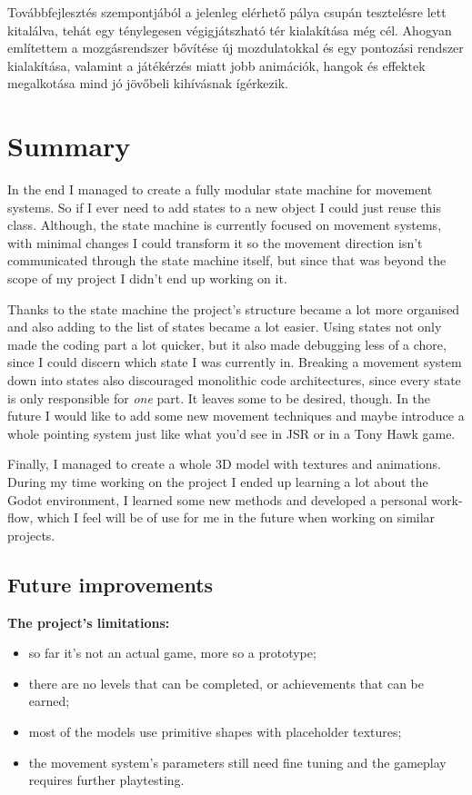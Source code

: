 Továbbfejlesztés szempontjából a jelenleg elérhető pálya csupán tesztelésre lett kitalálva, tehát egy ténylegesen végigjátszható tér kialakítása még cél. Ahogyan említettem a mozgásrendszer bővítése új mozdulatokkal és egy pontozási rendszer kialakítása, valamint a játékérzés miatt jobb animációk, hangok és effektek megalkotása mind jó jövőbeli kihívásnak ígérkezik.

\chapter{Summary}

In the end I managed to create a fully modular state machine for movement systems. So if I ever need to add states to a new object I could just reuse this class. Although, the state machine is currently focused on movement systems, with minimal changes I could transform it so the movement direction isn't communicated through the state machine itself, but since that was beyond the scope of my project I didn't end up working on it.

Thanks to the state machine the project's structure became a lot more organised and also adding to the list of states became a lot easier. Using states not only made the coding part a lot quicker, but it also made debugging less of a chore, since I could discern which state I was currently in. Breaking a movement system down into states also discouraged monolithic code architectures, since every state is only responsible for \textit{one} part. It leaves some to be desired, though. In the future I would like to add some new movement techniques and maybe introduce a whole pointing system just like what you'd see in JSR or in a Tony Hawk game.

Finally, I managed to create a whole 3D model with textures and animations. During my time working on the project I ended up learning a lot about the Godot environment, I learned some new methods and developed a personal work-flow, which I feel will be of use for me in the future when working on similar projects.

\section{Future improvements}

\textbf{The project's limitations:}
\begin{itemize}
	\item so far it's not an actual game, more so a prototype;
	\item there are no levels that can be completed, or achievements that can be earned;
	\item most of the models use primitive shapes with placeholder textures;
	\item the movement system's parameters still need fine tuning and the gameplay requires further playtesting.
\end{itemize}

